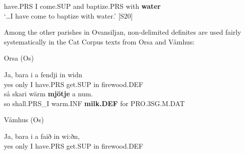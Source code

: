  have.PRS  I  come.SUP  and  baptize.PRS  with  \textbf{water}\\

\glt ‘…I have come to baptize with water.’ [S20]

\z

Among the other parishes in Ovansiljan, non-delimited definites are used fairly systematically in the Cat Corpus texts from Orsa and Våmhus: 


\item 


\item 

Orsa (Os)



 \ea\label{}
\gll Ja,  bara  i  a  fendji  in  widn\\


yes  only  I  have.PRS  get.SUP  in  firewood.DEF\\

 \ea\label{}
\gll så  skari  wärm  \textbf{mjötje} a  num.\\


so  shall.PRS\_I  warm.INF  \textbf{milk.DEF} for  PRO.3SG.M.DAT\\

\item 

Våmhus (Os)



 \ea\label{}
\gll Ja,  bara  i  a  faið  in  wi:ðn,  \\


yes  only  I  have.PRS  get.SUP  in  firewood.DEF  \\

